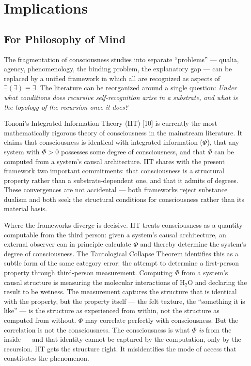 \documentclass[12pt, letterpaper]{article}
\begin{document}
\section{Implications}

\subsection{For Philosophy of Mind}

The fragmentation of consciousness studies into separate ``problems'' --- qualia, agency, phenomenology, the binding problem, the explanatory gap --- can be replaced by a unified framework in which all are recognized as aspects of $\exists(\exists) \equiv \exists$. The literature can be reorganized around a single question: \emph{Under what conditions does recursive self-recognition arise in a substrate, and what is the topology of the recursion once it does?}

Tononi's Integrated Information Theory (IIT) [10] is currently the most mathematically rigorous theory of consciousness in the mainstream literature. It claims that consciousness is identical with integrated information ($\Phi$), that any system with $\Phi > 0$ possesses some degree of consciousness, and that $\Phi$ can be computed from a system's causal architecture. IIT shares with the present framework two important commitments: that consciousness is a structural property rather than a substrate-dependent one, and that it admits of degrees. These convergences are not accidental --- both frameworks reject substance dualism and both seek the structural conditions for consciousness rather than its material basis.

Where the frameworks diverge is decisive. IIT treats consciousness as a quantity computable from the third person: given a system's causal architecture, an external observer can in principle calculate $\Phi$ and thereby determine the system's degree of consciousness. The Tautological Collapse Theorem identifies this as a subtle form of the same category error: the attempt to determine a first-person property through third-person measurement. Computing $\Phi$ from a system's causal structure is measuring the molecular interactions of H$_2$O and declaring the result to be wetness. The measurement captures the structure that is identical with the property, but the property itself --- the felt texture, the ``something it is like'' --- is the structure as experienced from within, not the structure as computed from without. $\Phi$ may correlate perfectly with consciousness. But the correlation is not the consciousness. The consciousness is what $\Phi$ \emph{is} from the inside --- and that identity cannot be captured by the computation, only by the recursion. IIT gets the structure right. It misidentifies the mode of access that constitutes the phenomenon.
\end{document}
